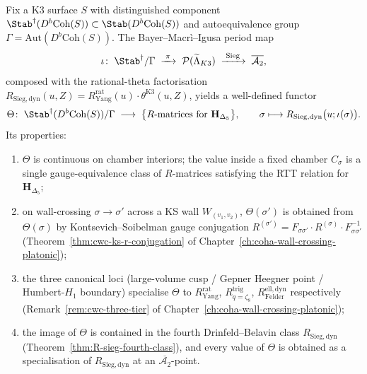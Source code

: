 \begin{theorem}
\label{thm:dcy-beilinson-dictionary}
Fix a K3 surface $S$ with distinguished component
$\Stab^\dagger(D^b\mathrm{Coh}(S))\subset\Stab(D^b\mathrm{Coh}(S))$ and
autoequivalence group $\Gamma=\mathrm{Aut}(D^b\mathrm{Coh}(S))$. The
Bayer--Macr\`i--Igusa period map
\[
 \iota\colon\;
 \Stab^\dagger/\Gamma\;\xrightarrow{\;\pi\;}\;
 \mathcal{P}(\widetilde{\Lambda}_{K3})\;\xrightarrow{\;\mathrm{Sieg}\;}\;
 \overline{\mathcal{A}_2},
\]
composed with the rational-theta factorisation
$R_{\mathrm{Sieg,dyn}}(u,Z)=R^{\mathrm{rat}}_{\mathrm{Yang}}(u)
\cdot\theta^{\mathrm{K3}}(u,Z)$, yields a well-defined functor
\[
 \Theta\colon\;
 \Stab^\dagger(D^b\mathrm{Coh}(S))/\Gamma
 \;\longrightarrow\;
 \bigl\{R\text{-matrices for }\mathbf{H}_{\Delta_5}\bigr\},
 \qquad
 \sigma\longmapsto R_{\mathrm{Sieg,dyn}}\bigl(u;\iota(\sigma)\bigr).
\]
Its properties:
\begin{enumerate}[label=\textup{(\roman*)}]
\item $\Theta$ is continuous on chamber interiors; the value inside a
 fixed chamber $C_\sigma$ is a single gauge-equivalence class of
 $R$-matrices satisfying the RTT relation for
 $\mathbf{H}_{\Delta_5}$;
\item on wall-crossing $\sigma\to\sigma'$ across a KS wall
 $W_{(v_1,v_2)}$, $\Theta(\sigma')$ is obtained from $\Theta(\sigma)$
 by Kontsevich--Soibelman gauge conjugation
 $R^{(\sigma')}=F_{\sigma\sigma'}\cdot R^{(\sigma)}\cdot
 F_{\sigma\sigma'}^{-1}$
 (Theorem~\ref{thm:cwc-ks-r-conjugation} of
 Chapter~\ref{ch:coha-wall-crossing-platonic});
\item the three canonical loci
 (large-volume cusp / Gepner Heegner point / Humbert-$H_1$ boundary)
 specialise $\Theta$ to
 $R^{\mathrm{rat}}_{\mathrm{Yang}}$, $R^{\mathrm{trig}}_{q=\zeta_8}$,
 $R^{\mathrm{ell,dyn}}_{\mathrm{Felder}}$ respectively
 (Remark~\ref{rem:cwc-three-tier} of
 Chapter~\ref{ch:coha-wall-crossing-platonic});
\item the image of $\Theta$ is contained in the fourth Drinfeld--Belavin
 class $R_{\mathrm{Sieg,dyn}}$
 (Theorem~\ref{thm:R-sieg-fourth-class}), and every value of
 $\Theta$ is obtained as a specialisation of
 $R_{\mathrm{Sieg,dyn}}$ at an $\overline{\mathcal{A}_2}$-point.
\end{enumerate}
\end{theorem}

